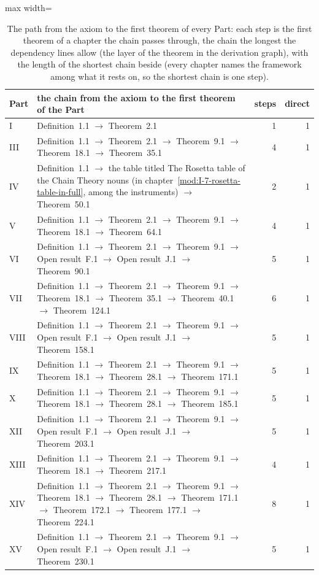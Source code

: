 \begin{table}[htbp]\centering\footnotesize
\begin{adjustbox}{max width=\linewidth}\begin{tabular}{p{12mm}p{112mm}rr}
Part & the chain from the axiom to the first theorem of the Part & steps & direct \\ \hline
I & Definition~1.1 $\to$ Theorem~2.1 & 1 & 1 \\
III & Definition~1.1 $\to$ Theorem~2.1 $\to$ Theorem~9.1 $\to$ Theorem~18.1 $\to$ Theorem~35.1 & 4 & 1 \\
IV & Definition~1.1 $\to$ the table titled The Rosetta table of the Chain Theory nouns (in chapter~\ref{mod:I-7-rosetta-table-in-full}, among the instruments) $\to$ Theorem~50.1 & 2 & 1 \\
V & Definition~1.1 $\to$ Theorem~2.1 $\to$ Theorem~9.1 $\to$ Theorem~18.1 $\to$ Theorem~64.1 & 4 & 1 \\
VI & Definition~1.1 $\to$ Theorem~2.1 $\to$ Theorem~9.1 $\to$ Open result~F.1 $\to$ Open result~J.1 $\to$ Theorem~90.1 & 5 & 1 \\
VII & Definition~1.1 $\to$ Theorem~2.1 $\to$ Theorem~9.1 $\to$ Theorem~18.1 $\to$ Theorem~35.1 $\to$ Theorem~40.1 $\to$ Theorem~124.1 & 6 & 1 \\
VIII & Definition~1.1 $\to$ Theorem~2.1 $\to$ Theorem~9.1 $\to$ Open result~F.1 $\to$ Open result~J.1 $\to$ Theorem~158.1 & 5 & 1 \\
IX & Definition~1.1 $\to$ Theorem~2.1 $\to$ Theorem~9.1 $\to$ Theorem~18.1 $\to$ Theorem~28.1 $\to$ Theorem~171.1 & 5 & 1 \\
X & Definition~1.1 $\to$ Theorem~2.1 $\to$ Theorem~9.1 $\to$ Theorem~18.1 $\to$ Theorem~28.1 $\to$ Theorem~185.1 & 5 & 1 \\
XII & Definition~1.1 $\to$ Theorem~2.1 $\to$ Theorem~9.1 $\to$ Open result~F.1 $\to$ Open result~J.1 $\to$ Theorem~203.1 & 5 & 1 \\
XIII & Definition~1.1 $\to$ Theorem~2.1 $\to$ Theorem~9.1 $\to$ Theorem~18.1 $\to$ Theorem~217.1 & 4 & 1 \\
XIV & Definition~1.1 $\to$ Theorem~2.1 $\to$ Theorem~9.1 $\to$ Theorem~18.1 $\to$ Theorem~28.1 $\to$ Theorem~171.1 $\to$ Theorem~172.1 $\to$ Theorem~177.1 $\to$ Theorem~224.1 & 8 & 1 \\
XV & Definition~1.1 $\to$ Theorem~2.1 $\to$ Theorem~9.1 $\to$ Open result~F.1 $\to$ Open result~J.1 $\to$ Theorem~230.1 & 5 & 1 \\
\end{tabular}\end{adjustbox}
\caption{The path from the axiom to the first theorem of every Part: each step is the first theorem of a chapter the chain passes through, the chain the longest the dependency lines allow (the layer of the theorem in the derivation graph), with the length of the shortest chain beside (every chapter names the framework among what it rests on, so the shortest chain is one step).}\label{tab:paths}
\end{table}
